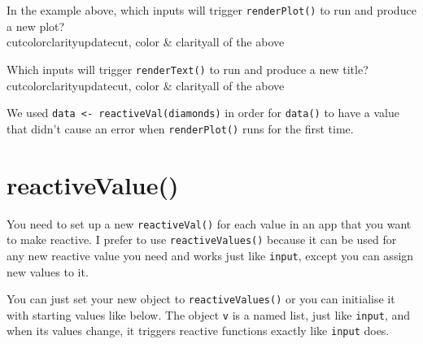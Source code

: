 \documentclass[
  oneside]{book}
\begin{document}
In the example above, which inputs will trigger \texttt{renderPlot}\texttt{()} to run and produce a new plot?\\
cutcolorclarityupdatecut, color \& clarityall of the above

Which inputs will trigger \texttt{renderText}\texttt{()} to run and produce a new title?\\
cutcolorclarityupdatecut, color \& clarityall of the above

\begin{info}
We used \texttt{data\ \textless{}-\ reactiveVal(diamonds)} in order for \texttt{data}\texttt{()} to have a value that didn't cause an error when \texttt{renderPlot}\texttt{()} runs for the first time.

\end{info}

\hypertarget{reactivevalue}{%
\section{reactiveValue()}\label{reactivevalue}}

You need to set up a new \texttt{reactiveVal}\texttt{()} for each value in an app that you want to make reactive. I prefer to use \texttt{reactiveValues}\texttt{()} because it can be used for any new reactive value you need and works just like \texttt{input}, except you can assign new values to it.

You can just set your new object to \texttt{reactiveValues}\texttt{()} or you can initialise it with starting values like below. The object \texttt{v} is a named list, just like \texttt{input}, and when its values change, it triggers reactive functions exactly like \texttt{input} does.
\end{document}

